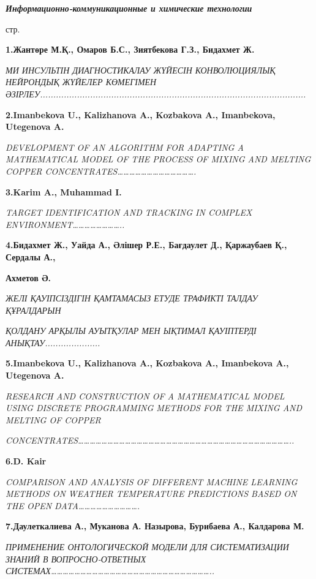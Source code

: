 \emph{\textbf{Информационно-коммуникационные и химические технологии}}

стр.

\textbf{1.Жантөре М.Қ., Омаров Б.С., Зиятбекова Г.З., Бидахмет Ж.}

\emph{МИ ИНСУЛЬТІН ДИАГНОСТИКАЛАУ ЖҮЙЕСІН КОНВОЛЮЦИЯЛЫҚ НЕЙРОНДЫҚ
ЖҮЙЕЛЕР КӨМЕГІМЕН
ӘЗІРЛЕУ.....................................................................................................}

\textbf{2.Imanbekova U., Kalizhanova A., Kozbakova A., Imanbekova,
Utegenova A.}

\emph{DEVELOPMENT OF AN ALGORITHM FOR ADAPTING A MATHEMATICAL MODEL OF
THE PROCESS OF MIXING AND MELTING COPPER
CONCENTRATES\ldots\ldots\ldots\ldots\ldots\ldots\ldots\ldots\ldots\ldots\ldots\ldots\ldots.}

\textbf{3.Karim A., Muhammad I.}

\emph{TARGET IDENTIFICATION AND TRACKING IN COMPLEX
ENVIRONMENT\ldots\ldots\ldots\ldots\ldots\ldots\ldots\ldots..}

\textbf{4.Бидахмет Ж., Уайда А., Әлішер Р.Е., Бағдаулет Д., Қаржаубаев
Қ., Сердалы А.,}

\textbf{Ахметов Ә.}

\emph{ЖЕЛІ ҚАУІПСІЗДІГІН ҚАМТАМАСЫЗ ЕТУДЕ ТРАФИКТІ ТАЛДАУ ҚҰРАЛДАРЫН}

\emph{ҚОЛДАНУ АРҚЫЛЫ АУЫТҚУЛАР МЕН ЫҚТИМАЛ ҚАУІПТЕРДІ
АНЫҚТАУ.....................}

\textbf{5.Imanbekova U., Kalizhanova A., Kozbakova A., Imanbekova A.,
Utegenova A.}

\emph{RESEARCH AND CONSTRUCTION OF A MATHEMATICAL MODEL USING DISCRETE
PROGRAMMING METHODS FOR THE MIXING AND MELTING OF COPPER}

\emph{CONCENTRATES\ldots\ldots\ldots\ldots\ldots\ldots\ldots\ldots\ldots\ldots\ldots\ldots\ldots\ldots\ldots\ldots\ldots\ldots\ldots\ldots\ldots\ldots\ldots\ldots\ldots\ldots\ldots\ldots\ldots\ldots\ldots\ldots\ldots\ldots\ldots\ldots..}

\textbf{6.D. Kair}

\emph{COMPARISON AND ANALYSIS OF DIFFERENT MACHINE LEARNING METHODS ON
WEATHER TEMPERATURE PREDICTIONS BASED ON THE OPEN
DATA\ldots\ldots\ldots\ldots\ldots\ldots\ldots\ldots\ldots\ldots.}

\textbf{7.Даулеткалиева А., Муканова А. Назырова, Бурибаева А.,
Калдарова М.}

\emph{ПРИМЕНЕНИЕ ОНТОЛОГИЧЕСКОЙ МОДЕЛИ ДЛЯ СИСТЕМАТИЗАЦИИ ЗНАНИЙ В
ВОПРОСНО-ОТВЕТНЫХ
СИСТЕМАХ\ldots\ldots\ldots\ldots\ldots\ldots\ldots\ldots\ldots\ldots\ldots\ldots\ldots\ldots\ldots\ldots\ldots\ldots\ldots\ldots\ldots\ldots\ldots\ldots\ldots\ldots\ldots..}

